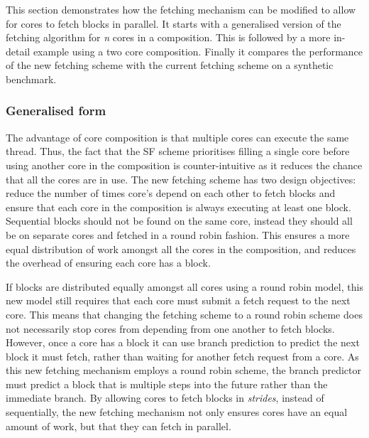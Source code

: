 This section demonstrates how the fetching mechanism can be modified to allow for cores to fetch blocks in parallel.
It starts with a generalised version of the fetching algorithm for \textit{n} cores in a composition.
This is followed by a more in-detail example using a two core composition.
Finally it compares the performance of the new fetching scheme with the current fetching scheme on a synthetic benchmark.

\subsubsection{Generalised form}
The advantage of core composition is that multiple cores can execute the same thread.
Thus, the fact that the SF scheme prioritises filling a single core before using another core in the composition is counter-intuitive as it reduces the chance that all the cores are in use.
The new fetching scheme has two design objectives: reduce the number of times core's depend on each other to fetch blocks and ensure that each core in the composition is always executing at least one block.
Sequential blocks should not be found on the same core, instead they should all be on separate cores and fetched in a round robin fashion.
This ensures a more equal distribution of work amongst all the cores in the composition, and reduces the overhead of ensuring each core has a block.

If blocks are distributed equally amongst all cores using a round robin model, this new model still requires that each core must submit a fetch request to the next core.
This means that changing the fetching scheme to a round robin scheme does not necessarily stop cores from depending from one another to fetch blocks.
However, once a core has a block it can use branch prediction to predict the next block it must fetch, rather than waiting for another fetch request from a core.
As this new fetching mechanism employs a round robin scheme, the branch predictor must predict a block that is multiple steps into the future rather than the immediate branch.
By allowing cores to fetch blocks in \textit{strides}, instead of sequentially, the new fetching mechanism not only ensures cores have an equal amount of work, but that they can fetch in parallel.

